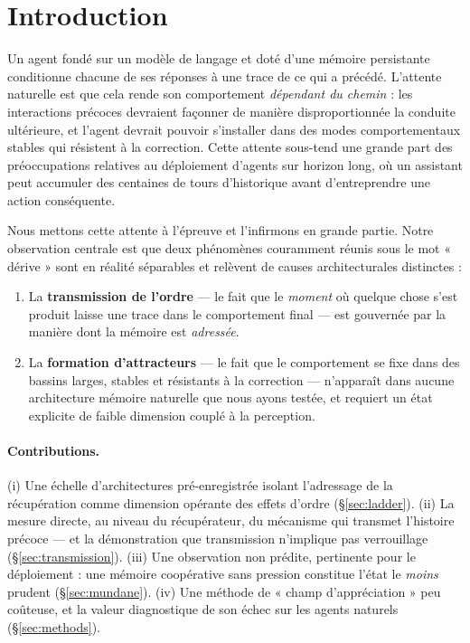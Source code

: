 \documentclass[11pt]{article}
\begin{document}
\section{Introduction}

Un agent fondé sur un modèle de langage et doté d'une mémoire persistante conditionne
chacune de ses réponses à une trace de ce qui a précédé. L'attente naturelle est que
cela rende son comportement \emph{dépendant du chemin} : les interactions précoces
devraient façonner de manière disproportionnée la conduite ultérieure, et l'agent
devrait pouvoir s'installer dans des modes comportementaux stables qui résistent à la
correction. Cette attente sous-tend une grande part des préoccupations relatives au
déploiement d'agents sur horizon long, où un assistant peut accumuler des centaines de
tours d'historique avant d'entreprendre une action conséquente.

Nous mettons cette attente à l'épreuve et l'infirmons en grande partie. Notre
observation centrale est que deux phénomènes couramment réunis sous le mot « dérive »
sont en réalité séparables et relèvent de causes architecturales distinctes :

\begin{enumerate}\itemsep0.15em
\item La \textbf{transmission de l'ordre} --- le fait que le \emph{moment} où quelque
chose s'est produit laisse une trace dans le comportement final --- est gouvernée par
la manière dont la mémoire est \emph{adressée}.
\item La \textbf{formation d'attracteurs} --- le fait que le comportement se fixe dans
des bassins larges, stables et résistants à la correction --- n'apparaît dans aucune
architecture mémoire naturelle que nous ayons testée, et requiert un état explicite de
faible dimension couplé à la perception.
\end{enumerate}

\paragraph{Contributions.}
(i) Une échelle d'architectures pré-enregistrée isolant l'adressage de la récupération
comme dimension opérante des effets d'ordre (\S\ref{sec:ladder}).
(ii) La mesure directe, au niveau du récupérateur, du mécanisme qui transmet
l'histoire précoce --- et la démonstration que transmission n'implique pas
verrouillage (\S\ref{sec:transmission}).
(iii) Une observation non prédite, pertinente pour le déploiement : une mémoire
coopérative sans pression constitue l'état le \emph{moins} prudent
(\S\ref{sec:mundane}).
(iv) Une méthode de « champ d'appréciation » peu coûteuse, et la valeur diagnostique
de son échec sur les agents naturels (\S\ref{sec:methods}).
\end{document}
